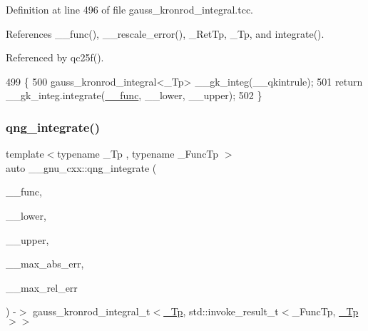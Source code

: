 Definition at line 496 of file gauss\+\_\+kronrod\+\_\+integral.\+tcc.



References \+\_\+\+\_\+func(), \+\_\+\+\_\+rescale\+\_\+error(), \+\_\+\+Ret\+Tp, \+\_\+\+Tp, and integrate().



Referenced by qc25f().


\begin{DoxyCode}
499     \{
500       gauss\_kronrod\_integral<\_Tp> \_\_gk\_integ(\_\_qkintrule);
501       \textcolor{keywordflow}{return} \_\_gk\_integ.integrate(\hyperlink{namespace____gnu__cxx_af2b2f0c7a2ae72b922b1afefae5a65b2}{\_\_func}, \_\_lower, \_\_upper);
502     \}
\end{DoxyCode}
\mbox{\label{namespace____gnu__cxx_aeb2e96052964961b91888d93c4433cbe}} 
\subsubsection{\texorpdfstring{qng\+\_\+integrate()}{qng\_integrate()}}
{\footnotesize\ttfamily template$<$typename \+\_\+\+Tp , typename \+\_\+\+Func\+Tp $>$ \\
auto \+\_\+\+\_\+gnu\+\_\+cxx\+::qng\+\_\+integrate (\begin{DoxyParamCaption}\item[{\+\_\+\+Func\+Tp}]{\+\_\+\+\_\+func,  }\item[{\hyperlink{namespace____gnu__cxx_a3b19a9c800ca194374ef9172290f7d79}{\+\_\+\+Tp}}]{\+\_\+\+\_\+lower,  }\item[{\hyperlink{namespace____gnu__cxx_a3b19a9c800ca194374ef9172290f7d79}{\+\_\+\+Tp}}]{\+\_\+\+\_\+upper,  }\item[{\hyperlink{namespace____gnu__cxx_a3b19a9c800ca194374ef9172290f7d79}{\+\_\+\+Tp}}]{\+\_\+\+\_\+max\+\_\+abs\+\_\+err,  }\item[{\hyperlink{namespace____gnu__cxx_a3b19a9c800ca194374ef9172290f7d79}{\+\_\+\+Tp}}]{\+\_\+\+\_\+max\+\_\+rel\+\_\+err }\end{DoxyParamCaption}) -\/$>$ gauss\+\_\+kronrod\+\_\+integral\+\_\+t$<$\hyperlink{namespace____gnu__cxx_a3b19a9c800ca194374ef9172290f7d79}{\+\_\+\+Tp}, std\+::invoke\+\_\+result\+\_\+t$<$\+\_\+\+Func\+Tp, \hyperlink{namespace____gnu__cxx_a3b19a9c800ca194374ef9172290f7d79}{\+\_\+\+Tp}$>$$>$
    }



